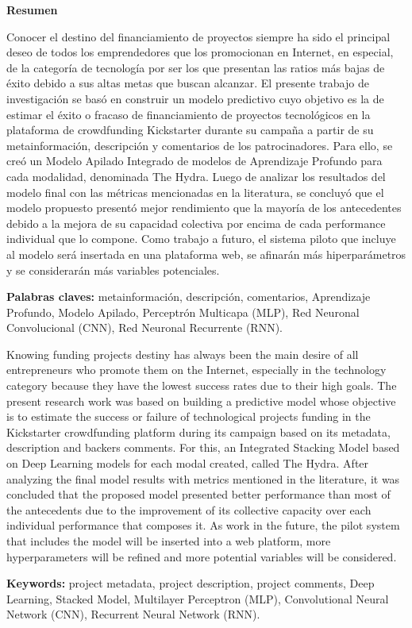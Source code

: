 \thispagestyle{plain}
\begin{center}
	{\Large \bfseries  Resumen}
\end{center}
\vspace{0.5cm}

Conocer el destino del financiamiento de proyectos siempre ha sido el principal deseo de todos los emprendedores que los promocionan en Internet, en especial, de la categoría de tecnología por ser los que presentan las ratios más bajas de éxito debido a sus altas metas que buscan alcanzar. El presente trabajo de investigación se basó en construir un modelo predictivo cuyo objetivo es la de estimar el éxito o fracaso de financiamiento de proyectos tecnológicos en la plataforma de crowdfunding Kickstarter durante su campaña a partir de su metainformación, descripción y comentarios de los patrocinadores. Para ello, se creó un Modelo Apilado Integrado de modelos de Aprendizaje Profundo para cada modalidad, denominada The Hydra. Luego de analizar los resultados del modelo final con las métricas mencionadas en la literatura, se concluyó que el modelo propuesto presentó mejor rendimiento que la mayoría de los antecedentes debido a la mejora de su capacidad colectiva por encima de cada performance individual que lo compone. Como trabajo a futuro, el sistema piloto que incluye al modelo será insertada en una plataforma web, se afinarán más hiperparámetros y se considerarán más variables potenciales.

\textbf{Palabras claves: } metainformación, descripción, comentarios, Aprendizaje Profundo, Modelo Apilado, Perceptrón Multicapa (MLP), Red Neuronal Convolucional (CNN), Red Neuronal Recurrente (RNN).

\vspace{0.5cm}
Knowing funding projects destiny has always been the main desire of all entrepreneurs who promote them on the Internet, especially in the technology category because they have the lowest success rates due to their high goals. The present research work was based on building a predictive model whose objective is to estimate the success or failure of technological projects funding in the Kickstarter crowdfunding platform during its campaign based on its metadata, description and backers comments. For this, an Integrated Stacking Model based on Deep Learning models for each modal created, called The Hydra. After analyzing the final model results with metrics mentioned in the literature, it was concluded that the proposed model presented better performance than most of the antecedents due to the improvement of its collective capacity over each individual performance that composes it. As work in the future, the pilot system that includes the model will be inserted into a web platform, more hyperparameters will be refined and more potential variables will be considered.

\textbf{Keywords: } project metadata, project description, project comments, Deep Learning, Stacked Model, Multilayer Perceptron (MLP), Convolutional Neural Network (CNN), Recurrent Neural Network (RNN).